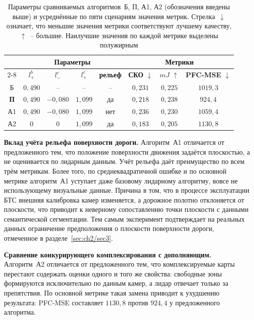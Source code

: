 \begin{table}[htbp]
	\small
	\centering
	\begin{tabular}{|c|c|c|c|c||c|c|c|}
		\hline
		& \multicolumn{4}{c||}{\textbf{Параметры}} & \multicolumn{3}{c|}{\textbf{Метрики}} \\
		\cline{2-8}
		& \boldmath$l^b_+$ & \boldmath$l^c_-$ & \boldmath$l^c_+$ & \textbf{рельеф} & \textbf{СКО} \tiny$\downarrow$ & \boldmath$mJ$ \tiny$\uparrow$ & \textbf{PFC-MSE} \tiny$\downarrow$ \\
		\hline
		Б & $0,490$ & -- & -- & -- & $0,231$ & $0,225$ & $1019,3$ \\
		\hline
		\textbf{П} & $0,490$ & $-0,080$ & $1,099$ & да & $0,218$ & \boldmath$0,238$ & \boldmath$924,4$ \\
		\hline
		А1 & $0,490$ & $-0,080$ & $1,099$ & нет & $0,236$ & $0,230$ & $1059,4$ \\
		\hline
		А2 & $0$ & $0$ & $1,099$ & да & \boldmath$0,183$ & $0,205$ & $1130,8$ \\
		\hline
	\end{tabular}
	\caption{Параметры сравниваемых алгоритмов~Б, П, А1, А2 (обозначения введены выше) и усреднённые по пяти сценариям значения метрик. Стрелка~$\downarrow$ означает, что меньшие значения метрики соответствуют лучшему качеству, $\uparrow$~-- большие. Наилучшие значения по каждой метрике выделены полужирным}
	\label{tab:true3dsegm-ablation}
\end{table}

\textbf{Вклад учёта рельефа поверхности дороги.} Алгоритм~А1 отличается от предложенного тем, что положение поверхности движения задаётся плоскостью, а не оценивается по лидарным данным. Учёт рельефа даёт преимущество по всем трём метрикам. Более того, по среднеквадратичной ошибке и по основной метрике алгоритм~А1 уступает даже базовому лидарному алгоритму, вовсе не использующему визуальные данные. Причина в том, что в процессе эксплуатации БТС внешняя калибровка камер изменяется, а дорожное полотно отклоняется от плоскости, что приводит к неверному сопоставлению точки плоскости с данными семантической сегментации. Тем самым эксперимент подтверждает на реальных данных ограничение предположения о плоскости поверхности дороги, отмеченное в разделе~\cref{sec:ch2/sec3}. 

\textbf{Сравнение конкурирующего комплексирования с дополняющим.} Алгоритм~А2 отличается от предложенного тем, что комплексируемые карты перестают содержать оценки одного и того же свойства: свободные зоны формируются исключительно по данным камер, а лидар отвечает только за препятствия. По основной метрике такая замена приводит к ухудшению результата: PFC-MSE составляет $1130,8$ против $924,4$ у предложенного алгоритма.

